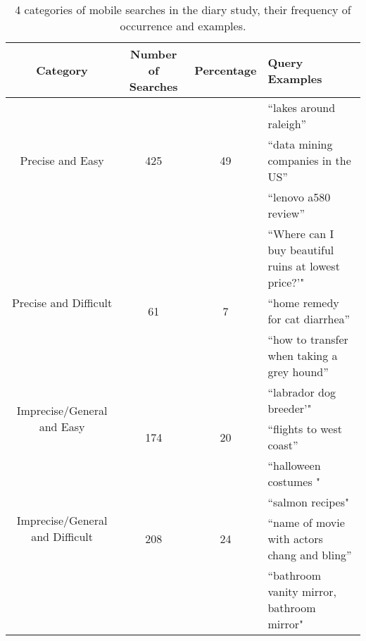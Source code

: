 



\begin{table*}[ht]
\begin{center}
    \begin{tabular}{ | c | c | c | l |}
    \hline
    Category &  Number of Searches & Percentage & Query Examples \\ \hline
   \multirow{3}{*}{Precise and Easy} & & &  ``lakes around raleigh'' \\
    					   & 425 & 49 & ``data mining companies in the US''\\ 				
					   & &  &  ``lenovo a580 review''  \\ \hline 
					   
   \multirow{3}{*}{Precise and Difficult} & & & ``Where can I buy beautiful ruins at lowest price?'"\\
    					   & 61 & 7 & ``home remedy for cat diarrhea''\\ 				
					   & &  & ``how to transfer when taking a grey hound''  \\ \hline 

   \multirow{2}{*}{ Imprecise/General and Easy} & & & ``labrador dog breeder'"\\
    					   & 174 & 20 & ``flights to west coast''\\
					   & & & ``halloween costumes "\\ \hline 

   \multirow{2}{*}{ Imprecise/General and Difficult} & & & ``salmon recipes"\\
    					   & 208 & 24 & ``name of movie with actors chang and bling''\\
					   & & & ``bathroom vanity mirror, bathroom mirror"\\ \hline 

   
 \end{tabular}
\end{center}
\label{searchcategories}
\caption{4 categories of mobile searches in the diary study, their frequency of occurrence and examples.}
\end{table*}

